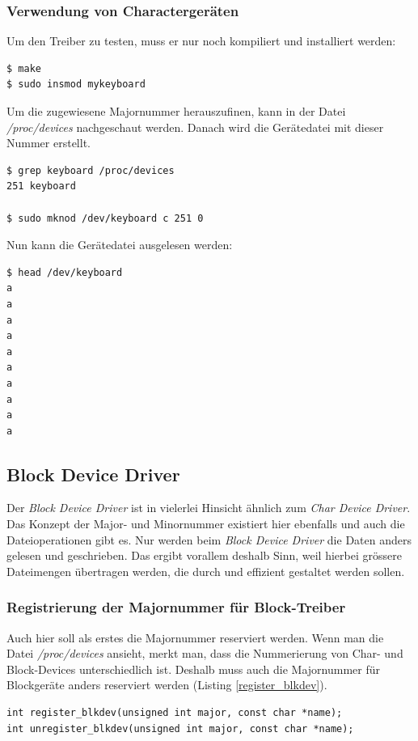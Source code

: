 \subsubsection{Verwendung von Charactergeräten}

Um den Treiber zu testen, muss er nur noch kompiliert und installiert werden:
\begin{lstlisting}
$ make
$ sudo insmod mykeyboard
\end{lstlisting} \hfill

Um die zugewiesene Majornummer herauszufinen, kann in der Datei \emph{/proc/devices} nachgeschaut werden. Danach
wird die Gerätedatei mit dieser Nummer erstellt.
\begin{lstlisting}
$ grep keyboard /proc/devices
251 keyboard

$ sudo mknod /dev/keyboard c 251 0
\end{lstlisting}

Nun kann die Gerätedatei ausgelesen werden:
\begin{lstlisting}
$ head /dev/keyboard 
a
a
a
a
a
a
a
a
a
a
\end{lstlisting}

\subsection{Block Device Driver}

Der \emph{Block Device Driver} ist in vielerlei Hinsicht ähnlich zum \emph{Char Device Driver}. Das Konzept der Major- und Minornummer existiert hier ebenfalls und 
auch die Dateioperationen gibt es. Nur werden beim \emph{Block Device Driver} die Daten anders gelesen und geschrieben. Das ergibt vorallem deshalb Sinn, weil hierbei
grössere Dateimengen übertragen werden, die durch  und  effizient gestaltet werden sollen.

\subsubsection{Registrierung der Majornummer für Block-Treiber}

Auch hier soll als erstes die Majornummer reserviert werden. Wenn man die Datei \emph{/proc/devices} ansieht, merkt man, dass die Nummerierung von Char- und Block-Devices
unterschiedlich ist. Deshalb muss auch die Majornummer für Blockgeräte anders reserviert werden (Listing \ref{register_blkdev}).

\begin{lstlisting}[label=register_blkdev,caption=Majornummer registrieren für Block-Treiber]
int register_blkdev(unsigned int major, const char *name);
int unregister_blkdev(unsigned int major, const char *name);
\end{lstlisting}

